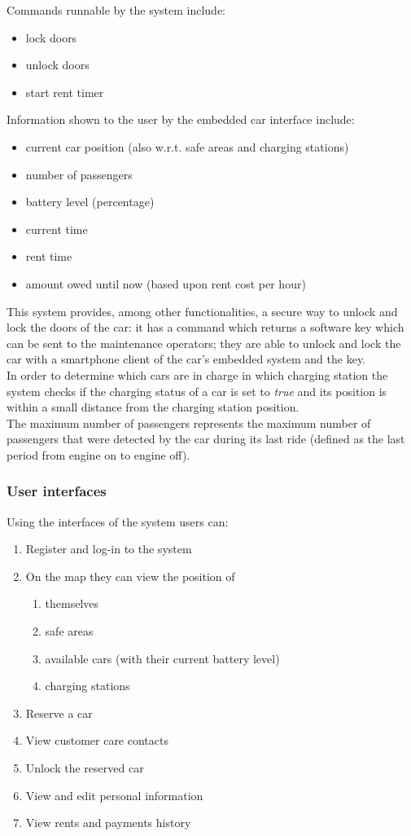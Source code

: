	Commands runnable by the system include:
	\begin{itemize}
		\item lock doors
		\item unlock doors
		\item start rent timer
	\end{itemize}		
	Information shown to the user by the embedded car interface include:
	\begin{itemize}
		\item current car position (also w.r.t. safe areas and charging stations)
		\item number of passengers
		\item battery level (percentage)
		\item current time
		\item rent time
		\item amount owed until now (based upon rent cost per hour)
	\end{itemize}
	
	This system provides, among other functionalities, a secure way to unlock and lock the doors of the car: it has a command which returns a software key which can be sent to the maintenance operators; they are able to unlock and lock the car with a smartphone client  of the car's embedded system and the key.\\
	
	In order to determine which cars are in charge in which charging station the system checks if the charging status of a car is set to \emph{true} and its position is within a small distance from the charging station position.\\
	
	The maximum number of passengers represents the maximum number of passengers that were detected by the car during its last ride (defined as the last period from engine on to engine off).\\
		
\subsubsection{User interfaces}
	Using the interfaces of the system users can:
	\begin{enumerate}
		\item Register and log-in to the system
		\item On the map they can view the position of
			\begin{enumerate}[label=\alph*)]
				\item themselves
				\item safe areas
				\item available cars (with their current battery level)
				\item charging stations
			\end{enumerate}
		\item Reserve a car
		\item View customer care contacts 
		\item Unlock the reserved car
		\item View and edit personal information
		\item View rents and payments history
	\end{enumerate}

